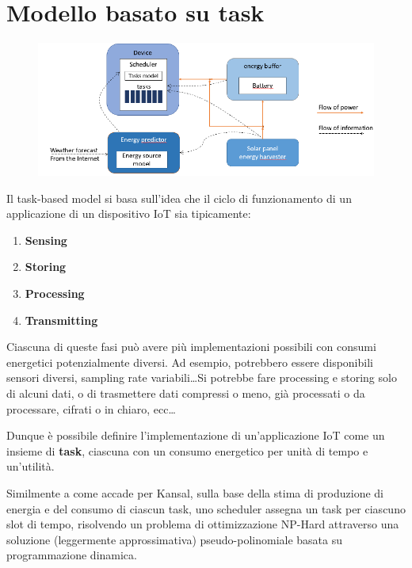 \section{Modello basato su task}

\begin{figure}[htbp]
   \centering
   \includegraphics{images/questions/Schermata del 2023-10-20 11-57-15.png}
   \label{fig:dom28}
\end{figure}

{\ns Il task-based model si basa sull'idea che il ciclo di funzionamento di un applicazione di un dispositivo IoT sia tipicamente:
\begin{enumerate}
   \item \textbf{Sensing}
   \item \textbf{Storing}
   \item \textbf{Processing}
   \item \textbf{Transmitting}
\end{enumerate}
Ciascuna di queste fasi può avere più implementazioni possibili con consumi energetici potenzialmente diversi.
Ad esempio, potrebbero essere disponibili sensori diversi, sampling rate variabili\dots Si potrebbe fare processing e storing solo di alcuni dati, o di trasmettere dati compressi o meno, già processati o da processare, cifrati o in chiaro, ecc\dots}
Dunque è possibile definire l'implementazione di un'applicazione IoT come un insieme di \textbf{task}, ciascuna con un consumo energetico per unità di tempo e un'utilità.

Similmente a come accade per Kansal, sulla base della stima di produzione di energia e del consumo di ciascun task, uno scheduler assegna un task per ciascuno slot di tempo,
risolvendo un problema di ottimizzazione NP-Hard attraverso una soluzione (leggermente approssimativa) pseudo-polinomiale basata su programmazione dinamica.

